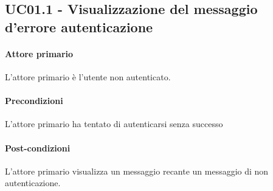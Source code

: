 \subsection{UC01.1 - Visualizzazione del messaggio d'errore autenticazione}\label{uc:01.1}

\paragraph{Attore primario} L'attore primario è l'utente non autenticato.

\paragraph{Precondizioni} L'attore primario ha tentato di autenticarsi senza successo

\paragraph{Post-condizioni} L'attore primario visualizza un messaggio recante un messaggio di non autenticazione.